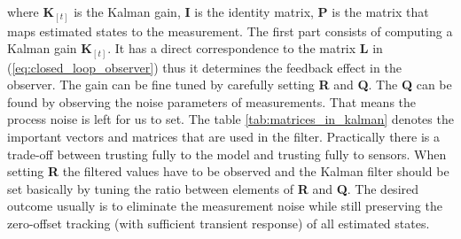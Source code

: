 where $\textbf{K}_{[t]}$ is the Kalman gain, $\mathbf{I}$ is the identity matrix, \textbf{P} is the matrix that maps estimated states to the measurement. The first part consists of computing a Kalman gain $\textbf{K}_{[t]}$. It has a direct correspondence to the matrix \textbf{L} in (\ref{eq:closed_loop_observer}) thus it determines the feedback effect in the observer. The gain can be fine tuned by carefully setting \textbf{R} and \textbf{Q}. The \textbf{Q} can be found by observing the noise parameters of measurements. That means the process noise is left for us to set. The table \ref{tab:matrices_in_kalman} denotes the important vectors and matrices that are used in the filter. Practically there is a trade-off between trusting fully to the model and trusting fully to sensors. When setting \textbf{R} the filtered values have to be observed and the Kalman filter should be set basically by tuning the ratio between elements of \textbf{R} and \textbf{Q}. The desired outcome usually is to eliminate the measurement noise while still preserving the zero-offset tracking (with sufficient transient response) of all estimated states.

